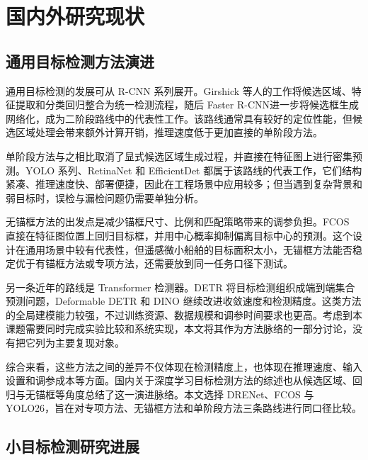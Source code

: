 \section{国内外研究现状}\label{sec:related_work}

\subsection{通用目标检测方法演进}

通用目标检测的发展可从 R-CNN 系列展开。Girshick 等人的工作\cite{girshick2014_rcnn}将候选区域、特征提取和分类回归整合为统一检测流程，随后 Faster R-CNN\cite{ren2015_fasterrcnn}进一步将候选框生成网络化，成为二阶段路线中的代表性工作。该路线通常具有较好的定位性能，但候选区域处理会带来额外计算开销，推理速度低于更加直接的单阶段方法。

单阶段方法与之相比取消了显式候选区域生成过程，并直接在特征图上进行密集预测。YOLO 系列\cite{redmon2016_yolo,redmon2018_yolov3}、RetinaNet\cite{lin2017_focalloss} 和 EfficientDet\cite{tan2020_efficientdet} 都属于该路线的代表工作，它们结构紧凑、推理速度快、部署便捷，因此在工程场景中应用较多；但当遇到复杂背景和弱目标时，误检与漏检问题仍需要单独分析。

无锚框方法的出发点是减少锚框尺寸、比例和匹配策略带来的调参负担。FCOS\cite{tian2019_fcos} 直接在特征图位置上回归目标框，并用中心概率抑制偏离目标中心的预测。这个设计在通用场景中较有代表性，但遥感微小船舶的目标面积太小，无锚框方法能否稳定优于有锚框方法或专项方法，还需要放到同一任务口径下测试。

另一条近年的路线是 Transformer 检测器。DETR\cite{carion2020_detr} 将目标检测组织成端到端集合预测问题，Deformable DETR\cite{zhu2021_deformabledetr} 和 DINO\cite{zhang2023_dino} 继续改进收敛速度和检测精度。这类方法的全局建模能力较强，不过训练资源、数据规模和调参时间要求也更高。考虑到本课题需要同时完成实验比较和系统实现，本文将其作为方法脉络的一部分讨论，没有把它列为主要复现对象。

综合来看，这些方法之间的差异不仅体现在检测精度上，也体现在推理速度、输入设置和调参成本等方面。国内关于深度学习目标检测方法的综述也从候选区域、回归与无锚框等角度总结了这一演进脉络\cite{zhang2020_detection_review_cn,zhao2020_detection_survey_cn}。本文选择 DRENet、FCOS 与 YOLO26，旨在对专项方法、无锚框方法和单阶段方法三条路线进行同口径比较。

\subsection{小目标检测研究进展}

